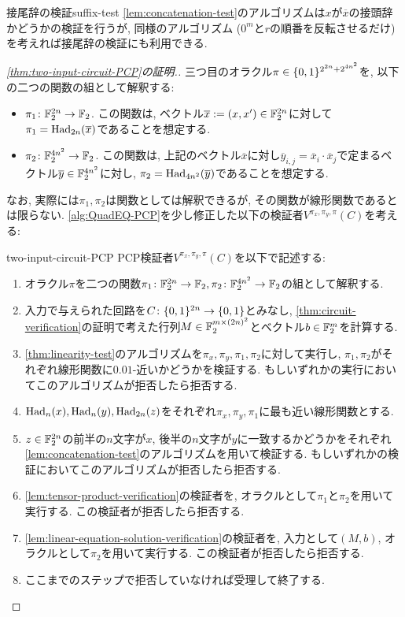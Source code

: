 \begin{remark}{接尾辞の検証}{suffix-test}
  \cref{lem:concatenation-test}のアルゴリズムは$x$が$\overline{x}$の接頭辞かどうかの検証を行うが, 同様のアルゴリズム ($0^m$と$r$の順番を反転させるだけ)を考えれば接尾辞の検証にも利用できる.
\end{remark}

\begin{proof}[\cref{thm:two-input-circuit-PCP}の証明.]
三つ目のオラクル$\pi\in\{0,1\}^{2^{2n} + 2^{4n^2}}$を, 以下の二つの関数の組として解釈する:
\begin{itemize}
  \item $\pi_1 \colon \mathbb{F}_2^{2n} \to \mathbb{F}_2$. この関数は, ベクトル$\overline{x}:=(x,x')\in\mathbb{F}_2^{2n}$に対して$\pi_1 = \mathrm{Had}_{2n}(\overline{x})$であることを想定する.
  \item $\pi_2 \colon \mathbb{F}_2^{4n^2} \to \mathbb{F}_2$. この関数は, 上記のベクトル$\overline{x}$に対し$\overline{y}_{i,j} = \overline{x}_i\cdot \overline{x}_j$で定まるベクトル$\overline{y}\in\mathbb{F}_2^{4n^2}$に対し, $\pi_2 = \mathrm{Had}_{4n^2}(\overline{y})$であることを想定する.
\end{itemize}
なお, 実際には$\pi_1,\pi_2$は関数としては解釈できるが, その関数が線形関数であるとは限らない.
\cref{alg:QuadEQ-PCP}を少し修正した以下の検証者$V^{\pi_x,\pi_{y},\pi}(C)$を考える:

\begin{algo}{}{two-input-circuit-PCP}
  PCP検証者$V^{\pi_x,\pi_{y},\pi}(C)$を以下で記述する:
  \begin{enumerate}
    \item オラクル$\pi$を二つの関数$\pi_1\colon\mathbb{F}_2^{2n}\to\mathbb{F}_2,\pi_2\colon\mathbb{F}_2^{4n^2}\to\mathbb{F}_2$の組として解釈する.
    \item 入力で与えられた回路を$C\colon\{0,1\}^{2n}\to\{0,1\}$とみなし, \cref{thm:circuit-verification}の証明で考えた行列$M\in\mathbb{F}_2^{m\times {(2n)^2}}$とベクトル$b\in\mathbb{F}_2^m$を計算する.
    \item \cref{thm:linearity-test}のアルゴリズムを$\pi_x,\pi_y,\pi_1,\pi_2$に対して実行し, $\pi_1,\pi_2$がそれぞれ線形関数に$0.01$-近いかどうかを検証する. もしいずれかの実行においてこのアルゴリズムが拒否したら拒否する.
    \item $\mathrm{Had}_n(x),\mathrm{Had}_n(y),\mathrm{Had}_{2n}(z)$をそれぞれ$\pi_x,\pi_y,\pi_1$に最も近い線形関数とする.
    \item $z\in\mathbb{F}_2^{2n}$の前半の$n$文字が$x$, 後半の$n$文字が$y$に一致するかどうかをそれぞれ\cref{lem:concatenation-test}のアルゴリズムを用いて検証する. もしいずれかの検証においてこのアルゴリズムが拒否したら拒否する.
    \item \cref{lem:tensor-product-verification}の検証者を, オラクルとして$\pi_1$と$\pi_2$を用いて実行する. この検証者が拒否したら拒否する.
    \item \cref{lem:linear-equation-solution-verification}の検証者を, 入力として$(M,b)$, オラクルとして$\pi_2$を用いて実行する. この検証者が拒否したら拒否する.
    \item ここまでのステップで拒否していなければ受理して終了する.
  \end{enumerate}
\end{algo}


\end{proof}
